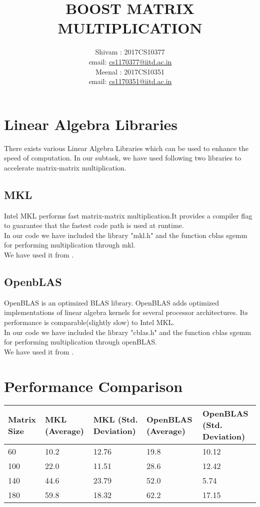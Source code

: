 \documentclass[a4paper,10pt]{article}
\title{\textbf{BOOST MATRIX MULTIPLICATION\\}}
\author{Shivam : 2017CS10377\\
        {\textit email: \href{mailto:cs1170377@iitd.ac.in}{cs1170377@iitd.ac.in}}\\
        Meenal : 2017CS10351\\
        {\textit email: \href{mailto:cs1170351@iitd.ac.in}{cs1170351@iitd.ac.in}}
        }
\begin{document}
\maketitle
\section{Linear Algebra Libraries}
There exists various Linear Algebra Libraries which can be used to enhance the speed of computation. In our subtask, we have used following two libraries to accelerate matrix-matrix multiplication. \\
\subsection{MKL}
Intel MKL performs fast matrix-matrix multiplication.It provides a compiler flag to guarantee that the fastest code path is used at runtime.\\
In our code we have included the library "mkl.h" and the function cblas sgemm for performing multiplication through mkl.\\
We have used it from \cite{IntelMKL}.

\subsection{OpenbLAS}
OpenBLAS is an optimized BLAS library. OpenBLAS adds optimized implementations of linear algebra kernels for several processor architectures. Its performance is comparable(slightly slow) to Intel MKL.\\
In our code we have included the library "cblas.h" and the function cblas sgemm for performing multiplication through openBLAS.\\
We have used it from \cite{OpenBLAS}.

\section{Performance Comparison}
\begin{center}
  \begin{tabular}{ p{1 cm} | p{2 cm} | p{2 cm} | p{2 cm} | p{2 cm}}
    \hline
    Matrix Size & MKL (Average) & MKL (Std. Deviation) & OpenBLAS (Average) & OpenBLAS (Std. Deviation)\\ \hline
     60 & 10.2 & 12.76 & 19.8 & 10.12\\ \hline
    100 & 22.0 & 11.51 & 28.6 & 12.42\\ \hline
    140 & 44.6 & 23.79 & 52.0 & 5.74\\ \hline
    180 & 59.8 & 18.32 & 62.2 & 17.15\\
    \hline
  \end{tabular}
\end{center}
\end{document}
